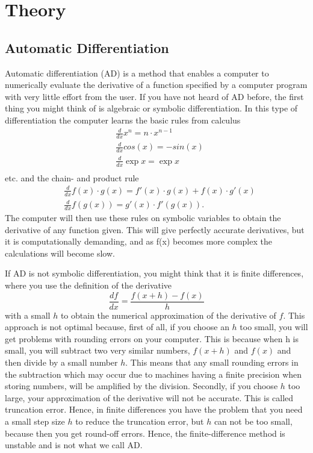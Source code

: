 \chapter{Theory}
\label{ch:theory}
\section{Automatic Differentiation}
\label{sec:AD}
Automatic differentiation (AD) is a method that enables a computer to numerically evaluate the derivative of a function specified by a computer program with very little effort from the user. If you have not heard of AD before, the first thing you might think of is algebraic or symbolic differentiation. In this type of differentiation the computer learns the basic rules from calculus
\begin{align*}
    &\frac{d}{dx}x^n     = n\cdot x^{n-1} \\
    &\frac{d}{dx}cos(x)  = -sin(x) \\
    &\frac{d}{dx}\exp{x} = \exp{x} \\
\end{align*}
etc. and the chain- and product rule
\begin{align*}
    &\frac{d}{dx}f(x)\cdot g(x) = f'(x)\cdot g(x) + f(x)\cdot g'(x) \\
    &\frac{d}{dx}f(g(x)) = g'(x)\cdot f'(g(x)).
\end{align*}
The computer will then use these rules on symbolic variables to obtain the derivative of any function given. This will give perfectly accurate derivatives, but it is computationally demanding, and as f(x) becomes more complex the calculations will become slow.

If AD is not symbolic differentiation, you might think that it is finite differences, where you use the definition of the derivative
\begin{equation*}
    \frac{df}{dx} = \frac{f(x+h) - f(x)}{h}
\end{equation*}
with a small $h$ to obtain the numerical approximation of the derivative of $f$. This approach is not optimal because, first of all, if you choose an $h$ too small, you will get problems with rounding errors on your computer. This is because when h is small, you will subtract two very similar numbers, $f(x+h)$ and $f(x)$ and then divide by a small number $h$. This means that any small rounding errors in the subtraction which may occur due to machines having a finite precision when storing numbers, will be amplified by the division. Secondly, if you choose $h$ too large, your approximation of the derivative will not be accurate. This is called truncation error. Hence, in finite differences you have the problem that you need a small step size $h$ to reduce the truncation error, but $h$ can not be too small, because then you get round-off errors. Hence, the finite-difference method is unstable and is not what we call AD.

